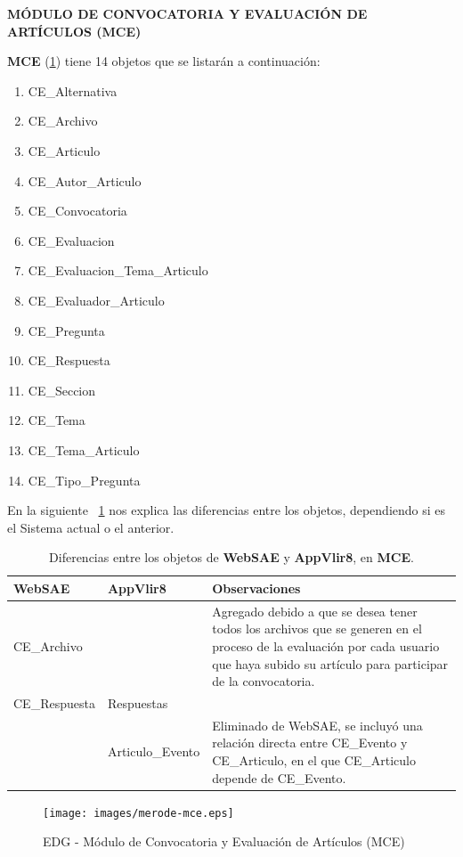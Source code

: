 \begin{indentar}
\textbf{M\'ODULO DE CONVOCATORIA Y EVALUACI\'ON DE ART\'ICULOS (MCE)}

\textbf{MCE} (\ref{edg:mce}) tiene 14 objetos que se listar\'an a continuaci\'on:

\begin{enumerate}
\item CE\_Alternativa
\item CE\_Archivo
\item CE\_Articulo
\item CE\_Autor\_Articulo
\item CE\_Convocatoria
\item CE\_Evaluacion
\item CE\_Evaluacion\_Tema\_Articulo
\item CE\_Evaluador\_Articulo
\item CE\_Pregunta
\item CE\_Respuesta
\item CE\_Seccion
\item CE\_Tema
\item CE\_Tema\_Articulo
\item CE\_Tipo\_Pregunta
\end{enumerate}

En la siguiente ~\ref{diferencias:websae-appvlir8-mce} nos explica las diferencias entre los objetos, dependiendo si es el Sistema actual o el anterior.

\begin{table}
	\begin{center}
	\begin{tabular}{|p{1.5in}|p{1.5in}|p{1.8in}|}
		\hline
		\textbf{WebSAE} & \textbf{AppVlir8} & \textbf{Observaciones} \\
		\hline\hline
			CE\_Archivo &  & Agregado debido a que se desea tener todos los archivos que se generen en el proceso de la evaluaci\'on por cada usuario que haya subido su art\'iculo para participar de la convocatoria. \\
		\hline
			CE\_Respuesta & Respuestas & \\
		\hline
			 & Articulo\_Evento & Eliminado de WebSAE, se incluy\'o una relaci\'on directa entre CE\_Evento y CE\_Articulo, en el que CE\_Articulo depende de CE\_Evento. \\
		\hline
	\end{tabular}
	\caption{Diferencias entre los objetos de \textbf{WebSAE} y \textbf{AppVlir8}, en \textbf{MCE}.}\label{diferencias:websae-appvlir8-mce}
	\end{center}
\end{table}

\begin{landscape}
\begin{figure}
  \centering
    {\texttt{[image: images/merode-mce.eps]}}
  \caption{EDG - M\'odulo de Convocatoria y Evaluaci\'on de Art\'iculos (MCE)}
  \label{edg:mce}
\end{figure}
\end{landscape}
\end{indentar}

